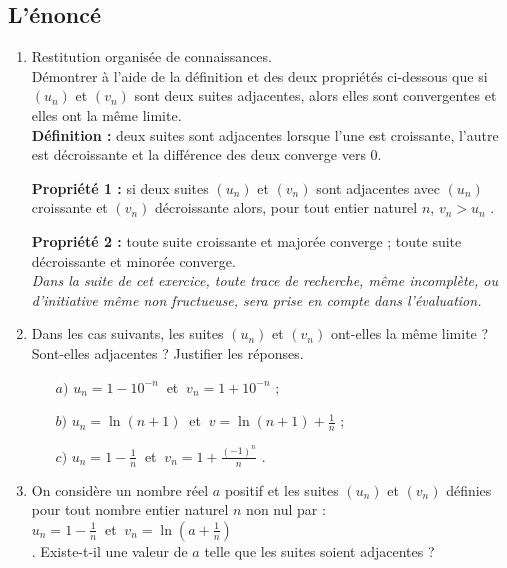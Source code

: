 \documentclass[a4paper,11pt]{book}
\begin{document}
\subsection{L'\'enonc\'e}
\begin{enumerate}    
\item  Restitution organis\'ee de connaissances.\\
D\'emontrer \`a l'aide de la d\'efinition et des deux propri\'et\'es ci-dessous
que si $(u_n)$ et $(v_n)$ sont deux suites adjacentes, alors elles sont 
convergentes et elles ont la m\^eme limite.\\

{\bf D\'efinition :} deux suites sont adjacentes lorsque l'une est 
croissante, l'autre est d\'ecroissante et la diff\'erence des deux converge 
vers 0.

{\bf Propri\'et\'e 1 :} si deux suites $(u_n)$ et $(v_n)$ sont adjacentes avec 
$(u_n)$ croissante et $(v_n)$ d\'ecroissante alors, pour tout entier naturel 
$n$, $v_n > u_n$ .

{\bf Propri\'et\'e 2 :} toute suite croissante et major\'ee converge ; toute 
suite d\'ecroissante et minor\'ee converge.\\

{\it Dans la suite de cet exercice, toute trace de recherche, m\^eme incompl\`ete, ou d'initiative m\^eme non fructueuse, sera prise en compte dans l'\'evaluation.}
\item Dans les cas suivants, les suites $(u_n)$ et $(v_n)$ ont-elles la m\^eme 
limite ? Sont-elles adjacentes ? Justifier les r\'eponses.
\begin{itemize}
\item[$a)$] $u_n=1-10^{-n}\ $ et $\ v_n=1+10^{-n}$ ;
\item[$b)$] $u_n=\ln(n+1)\ $ et $\ \displaystyle v=\ln(n+1)+\frac{1}{n}$        ;
\item[$c)$] $\displaystyle u_n=1-\frac{1}{n}\ $ et $\ \displaystyle v_n=1+\frac{(-1)^n}{n}$            .
\end{itemize}
\item On consid\`ere un nombre r\'eel $a$ positif et les suites $(u_n)$ et 
$(v_n)$ d\'efinies pour tout nombre entier naturel $n$ non nul par : \\
$\displaystyle u_n=1-\frac{1}{n}\ $  et  $\ \displaystyle v_n=\ln(a+\frac{1}{n})$\\.
Existe-t-il une valeur de $a$ telle que les suites soient adjacentes ?
\end{enumerate}
\end{document}
